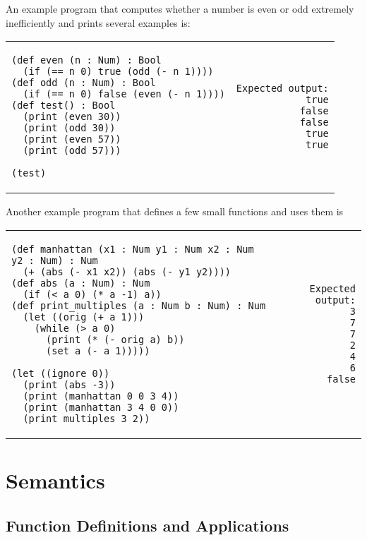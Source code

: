 \documentclass[10pt, oneside]{article}
\begin{document}
An example program that computes whether a number is even or odd extremely
inefficiently and prints several examples is:

\begin{tabular}{lr}
\begin{lstlisting}
(def even (n : Num) : Bool
  (if (== n 0) true (odd (- n 1))))
(def odd (n : Num) : Bool
  (if (== n 0) false (even (- n 1))))
(def test() : Bool
  (print (even 30))
  (print (odd 30))
  (print (even 57))
  (print (odd 57)))

(test)
\end{lstlisting}
& \hspace{5em}
\begin{lstlisting}
Expected output:
true
false
false
true
true
\end{lstlisting}
\end{tabular}

Another example program that defines a few small functions and uses them is

\begin{tabular}{lr}
\begin{lstlisting}
(def manhattan (x1 : Num y1 : Num x2 : Num y2 : Num) : Num
  (+ (abs (- x1 x2)) (abs (- y1 y2))))
(def abs (a : Num) : Num
  (if (< a 0) (* a -1) a))
(def print_multiples (a : Num b : Num) : Num
  (let ((orig (+ a 1)))
    (while (> a 0)
      (print (* (- orig a) b))
      (set a (- a 1)))))

(let ((ignore 0))
  (print (abs -3))
  (print (manhattan 0 0 3 4))
  (print (manhattan 3 4 0 0))
  (print_multiples 3 2))
\end{lstlisting}
& \hspace{5em}
\begin{lstlisting}
Expected output:
3
7
7
2
4
6
false
\end{lstlisting}
\end{tabular}

\section*{Semantics}

\subsection*{Function Definitions and Applications}
\end{document}
